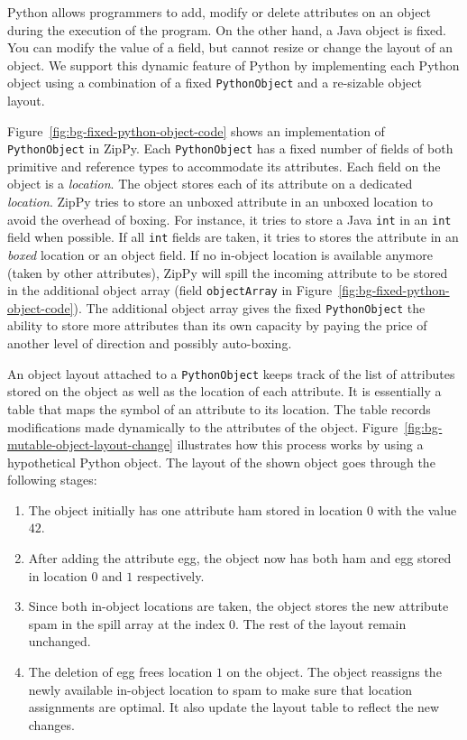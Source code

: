 Python allows programmers to add, modify or delete attributes on an object during the execution of the program.
On the other hand, a Java object is fixed.
You can modify the value of a field, but cannot resize or change the layout of an object.
We support this dynamic feature of Python by implementing each Python object using a combination of a fixed \texttt{PythonObject} and a re-sizable object layout.

Figure~\ref{fig:bg-fixed-python-object-code} shows an implementation of \texttt{PythonObject} in ZipPy.
Each \texttt{PythonObject} has a fixed number of fields of both primitive and reference types to accommodate its attributes.
Each field on the object is a \emph{location}.
The object stores each of its attribute on a dedicated \emph{location}.
ZipPy tries to store an unboxed attribute in an unboxed location to avoid the overhead of boxing.
For instance, it tries to store a Java \texttt{int} in an \texttt{int} field when possible.
If all \texttt{int} fields are taken, it tries to stores the attribute in an \emph{boxed} location or an object field.
If no in-object location is available anymore (taken by other attributes), ZipPy will spill the incoming attribute to be stored in the additional object array (field \texttt{objectArray} in Figure~\ref{fig:bg-fixed-python-object-code}).
The additional object array gives the fixed \texttt{PythonObject} the ability to store more attributes than its own capacity by paying the price of another level of direction and possibly auto-boxing.

An object layout attached to a \texttt{PythonObject} keeps track of the list of attributes stored on the object as well as the location of each attribute.
It is essentially a table that maps the symbol of an attribute to its location.
The table records modifications made dynamically to the attributes of the object.
Figure~\ref{fig:bg-mutable-object-layout-change} illustrates how this process works by using a hypothetical Python object.
The layout of the shown object goes through the following stages:

\begin{enumerate}

\item The object initially has one attribute \textsf{ham} stored in location $0$ with the value $42$.

\item After adding the attribute \textsf{egg}, the object now has both \textsf{ham} and \textsf{egg} stored in location $0$ and $1$ respectively.

\item Since both in-object locations are taken, the object stores the new attribute \textsf{spam} in the spill array at the index $0$.
The rest of the layout remain unchanged.

\item The deletion of \textsf{egg} frees location $1$ on the object.
The object reassigns the newly available in-object location to \textsf{spam} to make sure that location assignments are optimal.
It also update the layout table to reflect the new changes.

\end{enumerate}

